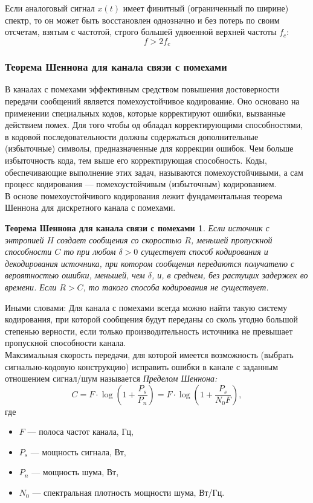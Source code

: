     Если аналоговый сигнал $x(t)$ имеет финитный (ограниченный по ширине) спектр, то он может быть восстановлен однозначно и без потерь по своим отсчетам, взятым с частотой, строго большей удвоенной верхней частоты $f_c:$ $$f>2f_c $$

\subsubsection{Теорема Шеннона для канала связи с помехами} %
В каналах с помехами эффективным средством повышения достоверности передачи сообщений является помехоустойчивое кодирование. Оно основано на применении специальных кодов, которые корректируют ошибки, вызванные действием помех. Для того чтобы од обладал корректирующими способностями, в кодовой последовательности должны содержаться дополнительные (избыточные) символы, предназначенные для коррекции ошибок. Чем больше избыточность кода, тем выше его корректирующая способность. Коды, обеспечивающие выполнение этих задач, называются помехоустойчивыми, а сам процесс кодирования — помехоустойчивым (избыточным) кодированием. \\\indent
В основе помехоустойчивого кодирования лежит фундаментальная теорема Шеннона для дискретного канала с помехами.
	\newtheorem*{Th3*}{Теорема Шеннона для канала связи с помехами}
	\begin{Th3*}\label{thShDir}
Если источник с энтропией $H$ создает сообщения со скоростью $R$, меньшей пропускной способности $C$ то при любом $\delta>0$ существует способ кодирования и декодирования источника, при котором сообщения передаются получателю с вероятностью ошибки, меньшей, чем $\delta$, и, в среднем, без растущих задержек во времени. Если $R > C$, то такого способа кодирования не существует.
	\end{Th3*}
Иными словами: Для канала с помехами всегда можно найти такую систему кодирования, при которой сообщения будут переданы со сколь угодно большой степенью верности, если только производительность источника не превышает пропускной способности канала.
\\\indent Максимальная скорость передачи, для которой имеется возможность (выбрать сигнально-кодовую конструкцию) исправить ошибки в канале с заданным отношением сигнал/шум называется {\it Пределом Шеннона:}
$$C=F\cdot \log\left( 1 + \frac{P_s}{P_n} \right) = F\cdot \log \left( 1+ \frac{P_s}{N_0 F} \right), $$
где \begin{itemize}
\item $F$ — полоса частот канала, Гц,
\item $P_s$ — мощность сигнала, Вт,
\item $P_n$  — мощность шума, Вт,
\item $N_0$  — спектральная плотность мощности шума, Вт/Гц.
\end{itemize}
\newpage

